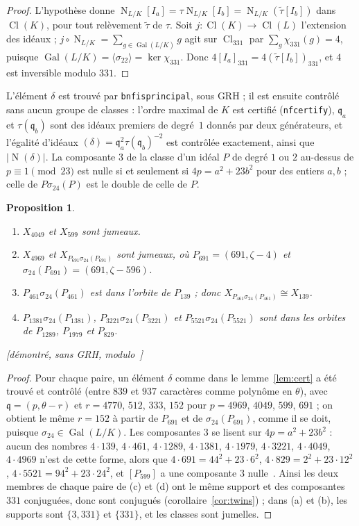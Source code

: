 \documentclass[11pt,a4paper]{amsart}
\theoremstyle{plain}
\newtheorem{proposition}{Proposition}[section]
\theoremstyle{definition}
\newcommand{\q}{\mathfrak{q}}
\DeclareMathOperator{\Nm}{N}
\DeclareMathOperator{\Cl}{Cl}
\DeclareMathOperator{\Gal}{Gal}
\newcommand{\st}[1]{\textup{\textsf{\small[#1]}}}
\begin{document}
\begin{proof}
L'hypothèse donne $\Nm_{L/K}[I_a]=\tau\Nm_{L/K}[I_b]=\Nm_{L/K}(\tilde\tau[I_b])$ dans $\Cl(K)$, pour tout relèvement $\tilde\tau$ de $\tau$. Soit $j\colon\Cl(K)\to\Cl(L)$ l'extension des idéaux ; $j\circ\Nm_{L/K}=\sum_{g\in\Gal(L/K)}g$ agit sur $\Cl_{331}$ par $\sum_g\chi_{331}(g)=4$, puisque $\Gal(L/K)=\langle\sigma_{22}\rangle=\ker\chi_{331}$. Donc $4[I_a]_{331}=4(\tilde\tau[I_b])_{331}$, et $4$ est inversible modulo $331$.
\end{proof}

L'élément $\delta$ est trouvé par \texttt{bnfisprincipal}, sous GRH ; il est ensuite contrôlé sans aucun groupe de classes : l'ordre maximal de $K$ est certifié (\texttt{nfcertify}), $\q_a$ et $\tau(\q_b)$ sont des idéaux premiers de degré~$1$ donnés par deux générateurs, et l'égalité d'idéaux $(\delta)=\q_a^2\tau(\q_b)^{-2}$ est contrôlée exactement, ainsi que $|\Nm(\delta)|$. La composante $3$ de la classe d'un idéal $P$ de degré $1$ ou $2$ au-dessus de $p\equiv1\pmod{23}$ est nulle si et seulement si $4p=a^2+23b^2$ pour des entiers $a,b$ ; celle de $P\sigma_{24}(P)$ est le double de celle de $P$.

\begin{proposition}\label{prop:certs}
\begin{enumerate}[label=\textup{(\alph*)}]
\item $X_{4049}$ et $X_{599}$ sont jumeaux.
\item $X_{4969}$ et $X_{P_{691}\sigma_{24}(P_{691})}$ sont jumeaux, où $P_{691}=(691,\zeta-4)$ et $\sigma_{24}(P_{691})=(691,\zeta-596)$.
\item $P_{461}\sigma_{24}(P_{461})$ est dans l'orbite de $P_{139}$ ; donc $X_{P_{461}\sigma_{24}(P_{461})}\cong X_{139}$.
\item $P_{1381}\sigma_{24}(P_{1381})$, $P_{3221}\sigma_{24}(P_{3221})$ et $P_{5521}\sigma_{24}(P_{5521})$ sont dans les orbites de $P_{1289}$, $P_{1979}$ et $P_{829}$.
\end{enumerate}
\st{démontré, sans GRH, modulo~\cite[prop.~2.2, 2.5]{Gau26}}
\end{proposition}

\begin{proof}
Pour chaque paire, un élément $\delta$ comme dans le lemme~\ref{lem:cert} a été trouvé et contrôlé (entre $839$ et $937$ caractères comme polynôme en $\theta$), avec $\q=(p,\theta-r)$ et $r=4770$, $512$, $333$, $152$ pour $p=4969$, $4049$, $599$, $691$ ; on obtient le même $r=152$ à partir de $P_{691}$ et de $\sigma_{24}(P_{691})$, comme il se doit, puisque $\sigma_{24}\in\Gal(L/K)$. Les composantes $3$ se lisent sur $4p=a^2+23b^2$ : aucun des nombres $4\cdot139$, $4\cdot461$, $4\cdot1289$, $4\cdot1381$, $4\cdot1979$, $4\cdot3221$, $4\cdot4049$, $4\cdot4969$ n'est de cette forme, alors que $4\cdot691=44^2+23\cdot6^2$, $4\cdot829=2^2+23\cdot12^2$, $4\cdot5521=94^2+23\cdot24^2$, et $[P_{599}]$ a une composante $3$ nulle~\cite[prop.~6.7]{Gau26}. Ainsi les deux membres de chaque paire de (c) et (d) ont le même support et des composantes $331$ conjuguées, donc sont conjugués (corollaire~\ref{cor:twins}) ; dans (a) et (b), les supports sont $\{3,331\}$ et $\{331\}$, et les classes sont jumelles.
\end{proof}
\end{document}
